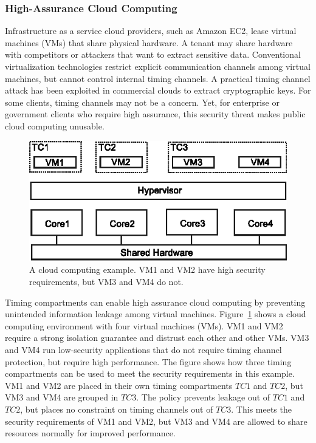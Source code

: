 \subsubsection{High-Assurance Cloud Computing}

Infrastructure as a service cloud providers, such as Amazon EC2, lease virtual 
machines (VMs) that share physical hardware. 
A tenant may share hardware with competitors or attackers that want
to extract sensitive data. Conventional virtualization technologies restrict 
explicit
communication channels among virtual machines, but cannot control internal
timing channels. A practical timing channel attack has been exploited
in commercial clouds to extract cryptographic keys\cite{heyyou}.
For some clients, timing channels may not be a concern. Yet, for enterprise or 
government clients who require high assurance,
this security threat makes public cloud computing unusable. 

\begin{figure}
    \begin{center}
        \includegraphics{figs/cloud_tcs.eps}
        \caption{A cloud computing example. VM1 and VM2 have high security 
        requirements, but VM3 and VM4 do not.}
        \label{fig:cloud_tcs}
    \end{center}
\end{figure}

Timing compartments can enable high assurance cloud computing by preventing
unintended information leakage among virtual machines.
Figure~\ref{fig:cloud_tcs} shows a cloud computing environment with four virtual 
machines (VMs).
VM1 and VM2 require a strong isolation guarantee and distrust each other and 
other VMs.
VM3 and VM4 run low-security applications that do not require timing channel 
protection, but require high performance. The figure shows how three timing 
compartments can be used to meet the security requirements in this example.
VM1 and VM2 are placed in their own timing compartments $TC1$ and $TC2$, but VM3 
and VM4 are grouped in $TC3$. The policy prevents leakage out of $TC1$ and 
$TC2$, but places no constraint on timing channels out of $TC3$. This meets the 
security requirements of VM1 and VM2, but VM3 and VM4 are allowed to share 
resources normally for improved performance.


